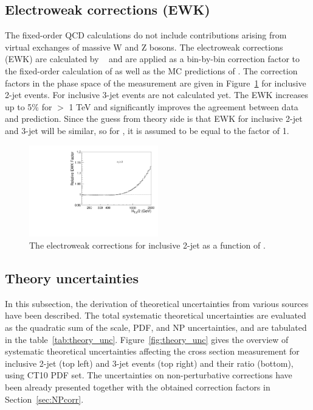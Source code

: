 \subsection{Electroweak corrections (EWK)}
\label{sec:EWK}

The fixed-order QCD calculations do not include contributions arising from virtual
exchanges of massive W and Z bosons. The electroweak corrections (EWK) are calculated by ~\cite{Dittmaier:2012kx} and are
applied as a bin-by-bin correction factor to the fixed-order calculation of \NLOJETPP 
as well as the MC predictions of \MadGraphF \plus \PYTHIAS. The correction factors in the
phase space of the measurement are given in Figure~\ref{fig:EW} for inclusive 2-jet events. 
For inclusive 3-jet events are not calculated yet. The EWK increases up to 5\% for \httwo $>$ 1 TeV and significantly improves the
agreement between data and prediction. Since the guess from theory side is that EWK for inclusive 2-jet and 3-jet will be similar, so for \ratio, it is assumed to be equal to the factor of 1.

\begin{figure}[!htbp]
\begin{center}
  \includegraphics[width=0.5\textwidth]{Plots_HT_2_150/EW_2.pdf}
  \caption{The electroweak corrections for inclusive 2-jet as a function of \httwo.}
  \label{fig:EW}
\end{center}
\end{figure}

\subsection{Theory uncertainties}
In this subsection, the derivation of theoretical uncertainties from various 
sources have been described. The total systematic theoretical uncertainties
are evaluated as the quadratic sum of the scale, PDF, and NP uncertainties, and are tabulated in the table~\ref{tab:theory_unc}. 
Figure~\ref{fig:theory_unc} gives the overview of systematic theoretical 
uncertainties affecting the cross section measurement
for inclusive 2-jet (top left) and 3-jet events (top right) and their
ratio \ratio (bottom), using CT10 PDF 
set. The uncertainties on non-perturbative 
corrections have been already presented together
with the obtained correction factors in Section~\ref{sec:NPcorr}. 

